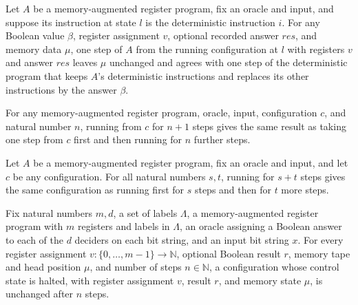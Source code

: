 \begin{lemma}
\label{Complexity.LogProg.mstep_det}
\leanok
{}
Let $A$ be a memory-augmented register program, fix an oracle and input, and suppose its
instruction at state $l$ is the deterministic instruction $i$. For any Boolean value
$\beta$, register assignment $v$, optional recorded answer $res$, and memory data $\mu$,
one step of $A$ from the running configuration at $l$ with registers $v$ and answer
$res$ leaves $\mu$ unchanged and agrees with one step of the deterministic program that
keeps $A$'s deterministic instructions and replaces its other instructions by the answer
$\beta$.
\end{lemma}

\begin{lemma}
\label{Complexity.LogProg.mrun_succ}
\leanok
{}
For any memory-augmented register program, oracle, input, configuration $c$, and natural
number $n$, running from $c$ for $n+1$ steps gives the same result as taking one step
from $c$ first and then running for $n$ further steps.
\end{lemma}

\begin{lemma}
\label{Complexity.LogProg.mrun_add}
\leanok
{}
Let $A$ be a memory-augmented register program, fix an oracle and input, and let $c$ be
any configuration. For all natural numbers $s,t$, running for $s+t$ steps gives the same
configuration as running first for $s$ steps and then for $t$ more steps.
\end{lemma}

\begin{lemma}
\label{Complexity.LogProg.mrun_halted}
\leanok
{}
Fix natural numbers $m,d$, a set of labels $\Lambda$, a memory-augmented register
program with $m$ registers and labels in $\Lambda$, an oracle assigning a Boolean answer
to each of the $d$ deciders on each bit string, and an input bit string $x$. For every
register assignment $v : \{0,\ldots,m-1\} \to \mathbb{N}$, optional Boolean result $r$,
memory tape and head position $\mu$, and number of steps $n \in \mathbb{N}$, a
configuration whose control state is halted, with register assignment $v$, result $r$,
and memory state $\mu$, is unchanged after $n$ steps.
\end{lemma}

